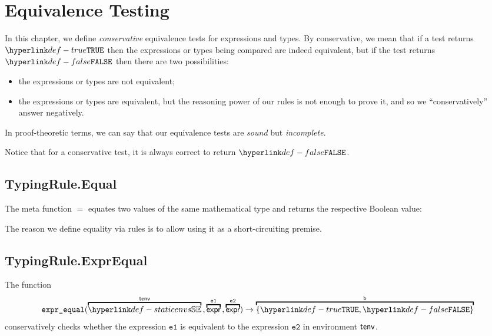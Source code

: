 \documentclass{book}
\newcommand\exprequal[0]{\texttt{expr\_equal}}
\newcommand\veone[0]{\texttt{e1}}
\newcommand\vetwo[0]{\texttt{e2}}
\begin{document}
\chapter{Equivalence Testing}

In this chapter, we define \emph{conservative} equivalence tests for expressions and types.
By conservative, we mean that if a test returns $\True$ then the expressions or types being
compared are indeed equivalent, but if the test returns $\False$ then
there are two possibilities:
\begin{itemize}
  \item the expressions or types are not equivalent;
  \item the expressions or types are equivalent, but the reasoning power of our rules
  is not enough to prove it, and so we ``conservatively'' answer negatively.
\end{itemize}
In proof-theoretic terms, we can say that our equivalence tests are \emph{sound} but \emph{incomplete}.

Notice that for a conservative test, it is always correct to return $\False$.

\section{TypingRule.Equal}
\hypertarget{def-equal}{}
The meta function $\equal$ equates two values of the same mathematical type and returns
the respective Boolean value:
The reason we define equality via rules is to allow using it as a short-circuiting premise.

\section{TypingRule.ExprEqual}
The function
\[
  \exprequal(\overname{\staticenvs}{\tenv} \aslsep \overname{\expr}{\veone} \aslsep \overname{\expr}{\vetwo}) \rightarrow \overname{\{\True, \False\}}{\vb}
\]
conservatively checks whether the expression $\veone$ is equivalent to the expression $\vetwo$ in environment $\textsf{tenv}$.
\end{document}
